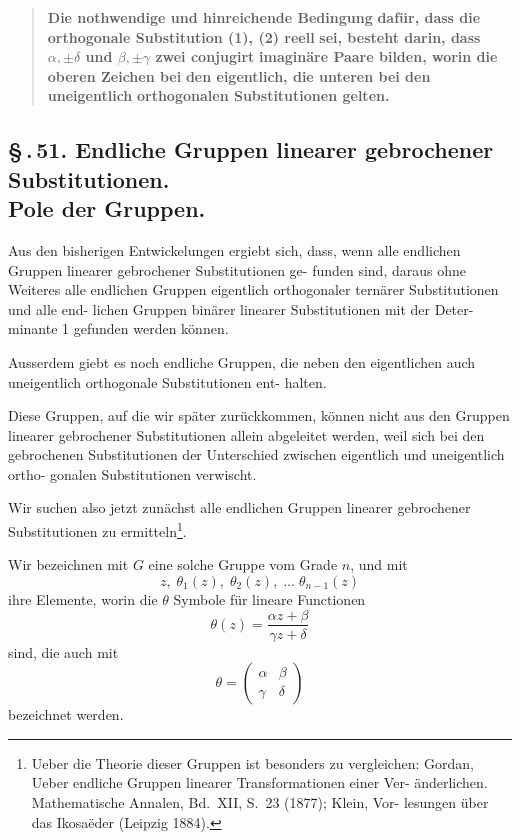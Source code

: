 \documentclass[12pt,a4paper]{article}
\theoremstyle{plain}
\theoremstyle{definition}
\theoremstyle{remark}
\newcommand{\sect}[1]{\S\,.\,#1.}
\begin{document}
\begin{quote}
\textbf{Die nothwendige und hinreichende Bedingung}
\textbf{daf\"ur, dass die orthogonale Substitution (1), (2) reell}
\textbf{sei, besteht darin, dass $\alpha, \pm\delta$ und $\beta, \pm\gamma$ zwei conjugirt}
\textbf{imagin\"are Paare bilden, worin die oberen Zeichen bei}
\textbf{den eigentlich, die unteren bei den uneigentlich}
\textbf{orthogonalen Substitutionen gelten.}
\end{quote}


\subsection*{\sect{51} Endliche Gruppen linearer gebrochener Substitutionen.\\[-0.3em] Pole der Gruppen.}

Aus den bisherigen Entwickelungen ergiebt sich, dass, wenn
alle endlichen Gruppen linearer gebrochener Substitutionen ge-
funden sind, daraus ohne Weiteres alle endlichen Gruppen
eigentlich orthogonaler tern\"arer Substitutionen und alle end-
lichen Gruppen bin\"arer linearer Substitutionen mit der Deter-
minante 1 gefunden werden k\"onnen.

Ausserdem giebt es noch endliche Gruppen, die neben den
eigentlichen auch uneigentlich orthogonale Substitutionen ent-
halten.

Diese Gruppen, auf die wir sp\"ater zur\"uckkommen, k\"onnen
nicht aus den Gruppen linearer gebrochener Substitutionen allein
abgeleitet werden, weil sich bei den gebrochenen Substitutionen
der Unterschied zwischen eigentlich und uneigentlich ortho-
gonalen Substitutionen verwischt.

Wir suchen also jetzt zun\"achst alle endlichen Gruppen
linearer gebrochener Substitutionen zu ermitteln\footnote{Ueber die Theorie dieser Gruppen ist besonders zu vergleichen:
Gordan, Ueber endliche Gruppen linearer Transformationen einer Ver-
\"anderlichen. Mathematische Annalen, Bd.~XII, S.~23 (1877); Klein, Vor-
lesungen \"uber das Ikosa\"eder (Leipzig 1884).}.

Wir bezeichnen mit $G$ eine solche Gruppe vom Grade $n$,
und mit
\begin{equation}\label{eq:51_1}
z,\; \theta_1(z),\; \theta_2(z),\; \ldots\; \theta_{n-1}(z)\tag{1}
\end{equation}
ihre Elemente, worin die $\theta$ Symbole f\"ur lineare Functionen
\begin{equation}\label{eq:51_2}
\theta(z) = \frac{\alpha z + \beta}{\gamma z + \delta}\tag{2}
\end{equation}
sind, die auch mit
\begin{equation}\label{eq:51_3}
\theta = \begin{pmatrix}\alpha & \beta\\ \gamma & \delta\end{pmatrix}\tag{3}
\end{equation}
bezeichnet werden.
\end{document}
